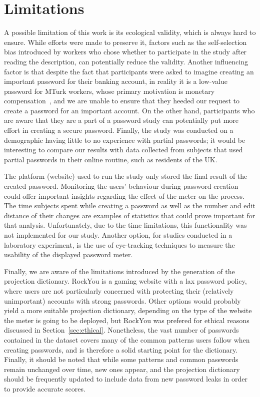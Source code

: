  \section{Limitations}
    \label{sec:limitations}
    A possible limitation of this work is its ecological validity, which is always hard to ensure. While efforts were made to preserve it, factors such as the self-selection bias introduced by workers who chose whether to participate in the study after reading the description, can potentially reduce the validity. Another influencing factor is that despite the fact that participants were asked to imagine creating an important password for their banking account, in reality it is a low-value password for MTurk workers, whose primary motivation is monetary compensation~\cite{mturk_demographic}, and we are unable to ensure that they heeded our request to create a password for an important account. On the other hand, participants who are aware that they are a part of a password study can potentially put more effort in creating a secure password. Finally, the study was conducted on a demographic having little to no experience with partial passwords; it would be interesting to compare our results with data collected from subjects that used partial passwords in their online routine, such as residents of the UK.

    The platform (website) used to run the study only stored the final result of the created password. Monitoring the users' behaviour during password creation could offer important insights regarding the effect of the meter on the process. The time subjects spent while creating a password as well as the number and edit distance of their changes are examples of statistics that could prove important for that analysis. Unfortunately, due to the time limitations, this functionality was not implemented for our study. Another option, for studies conducted in a laboratory experiment, is the use of eye-tracking techniques to measure the usability of the displayed password meter.

    Finally, we are aware of the limitations introduced by the generation of the projection dictionary. RockYou is a gaming website with a lax password policy, where users are not particularly concerned with protecting their (relatively unimportant) accounts with strong passwords. Other options would probably yield a more suitable projection dictionary, depending on the type of the website the meter is going to be deployed, but RockYou was prefered for ethical reasons discussed in Section~\ref{sec:ethical}. Nonetheless, the vast number of passwords contained in the dataset covers many of the common patterns users follow when creating passwords, and is therefore a solid starting point for the dictionary. Finally, it should be noted that while some patterns and common passwords remain unchanged over time, new ones appear, and the projection dictionary should be frequently updated to include data from new password leaks in order to provide accurate scores.


